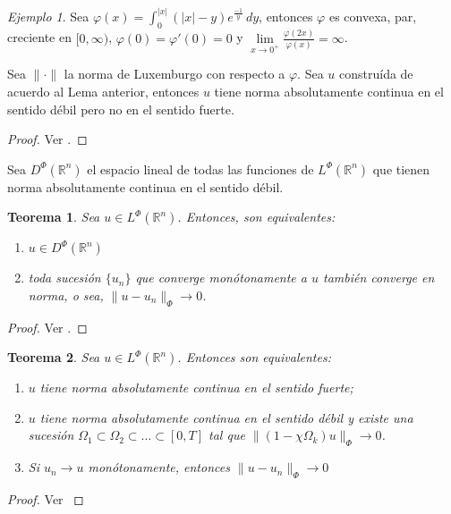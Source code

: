 \documentclass[a4paper,11pt]{amsart}
\theoremstyle{plain}
\newtheorem{thm}{Teorema}[section]
\theoremstyle{remark}
\theoremstyle{remark}
\newtheorem{ejem}{Ejemplo}
\newcommand{\rr}{\mathbb{R}}
\numberwithin{equation}{section}
\begin{document}
\begin{ejem}
Sea $\varphi(x)=\int_0^{|x|} (|x|-y)e^{\frac{-1}{y}}\,dy$, entonces $\varphi$ es convexa, par, creciente en $[0,\infty)$, $\varphi(0)=\varphi'(0)=0$ y $\lim\limits_{x\to 0^+}\frac{\varphi(2x)}{\varphi(x)}=\infty$.

Sea $\|\cdot\|$ la norma de Luxemburgo con respecto a $\varphi$. Sea $u$ constru\'ida de acuerdo al Lema anterior, entonces $u$ tiene norma absolutamente continua en el sentido d\'ebil pero no en el sentido fuerte.
\begin{proof}
Ver \cite[p.366]{Schap2005}.
\end{proof}
\end{ejem}



Sea $D^{\Phi}(\rr^n)$ el espacio lineal de todas las funciones de $L^{\Phi}(\rr^n)$ que tienen norma absolutamente continua en el sentido d\'ebil.


\begin{thm}
Sea $u \in L^{\Phi}(\rr^n)$. Entonces, son equivalentes:
\begin{enumerate}
\item $u \in D^{\Phi}(\rr^n)$ 
\item toda sucesi\'on $\{u_n\}$ que converge mon\'otonamente a $u$ tambi\'en converge en norma, o sea, $\|u-u_n\|_{\Phi}\to 0$.
\end{enumerate}
\end{thm}


\begin{proof}
Ver \cite[pp. 366-367]{Schap2005}.
\end{proof}

\begin{thm}
Sea $u \in L^{\Phi}(\rr^n)$. Entonces son equivalentes:
\begin{enumerate}
\item $u$ tiene norma absolutamente continua en el sentido fuerte;
\item $u$ tiene norma absolutamente continua en el sentido d\'ebil y existe una sucesi\'on 
$\Omega_1\subset \Omega_2\subset\dots\subset[0,T]$ tal que $\|(1-\chi \Omega_k)u\|_{\Phi}\to 0$.
\item Si $u_n \to u$ mon\'otonamente, entonces $\|u-u_n\|_{\Phi}\to 0$
\end{enumerate}
\end{thm}


\begin{proof}
Ver \cite[p. 368]{Schap2005}
\end{proof}
\end{document}
